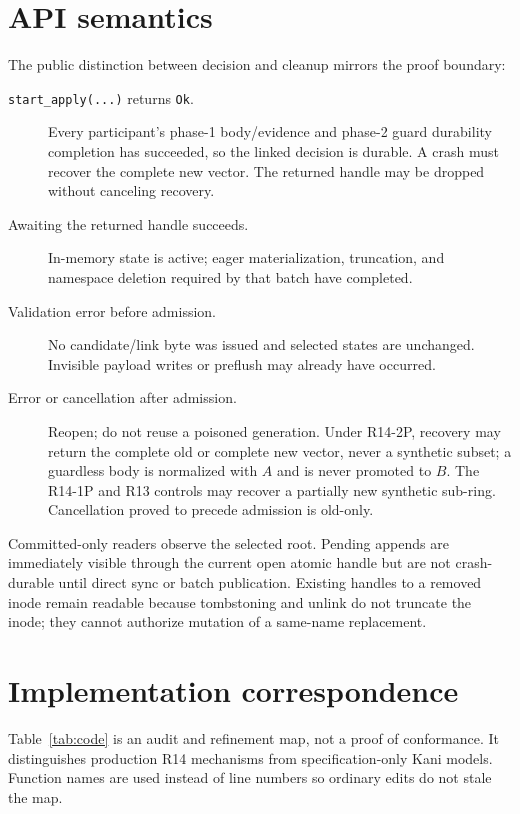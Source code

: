 \documentclass[10pt,twocolumn]{article}
\theoremstyle{remark}
\newcommand{\code}[1]{\texttt{#1}}
\begin{document}
\section{API semantics}

The public distinction between decision and cleanup mirrors the proof boundary:

\begin{description}
  \item[\code{start\_apply(...)} returns \code{Ok}.] Every participant's phase-1 body/evidence and
  phase-2 guard durability completion has succeeded, so the linked decision is durable. A crash
  must recover the complete new vector. The returned handle may be dropped without canceling recovery.
  \item[Awaiting the returned handle succeeds.] In-memory state is active; eager materialization,
  truncation, and namespace deletion required by that batch have completed.
  \item[Validation error before admission.] No candidate/link byte was issued and selected states
  are unchanged. Invisible payload writes or preflush may already have occurred.
  \item[Error or cancellation after admission.] Reopen; do not reuse a poisoned generation. Under
  R14-2P, recovery may return the complete old or complete new vector, never a synthetic subset; a
  guardless body is normalized with $A$ and is never promoted to $B$. The R14-1P and R13 controls
  may recover a partially new synthetic sub-ring. Cancellation proved to precede admission is
  old-only.
\end{description}

Committed-only readers observe the selected root. Pending appends are immediately visible through
the current open atomic handle but are not crash-durable until direct sync or batch publication.
Existing handles to a removed inode remain readable because tombstoning and unlink do not truncate
the inode; they cannot authorize mutation of a same-name replacement.

\section{Implementation correspondence}

Table~\ref{tab:code} is an audit and refinement map, not a proof of conformance. It distinguishes
production R14 mechanisms from specification-only Kani models. Function names are used instead of
line numbers so ordinary edits do not stale the map.
\end{document}
